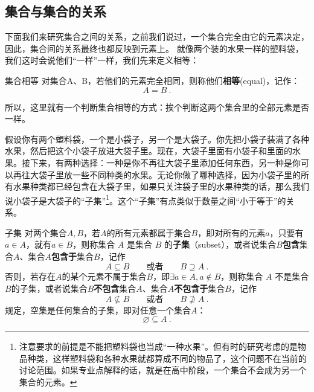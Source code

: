 \subsection{集合与集合的关系}\label{sub_HsSet_1}
下面我们来研究集合之间的关系，之前我们说过，一个集合完全由它的元素决定，因此，集合间的关系最终也都反映到元素上。
就像两个装的水果一样的塑料袋，我们这时会说他们“一样”一样，我们先来定义相等：
\begin{definition}{集合相等}
对集合A、B，若他们的元素完全相同，则称他们\textbf{相等}(equal)，记作：
\begin{equation}
A=B~.
\end{equation}
\end{definition}

所以，这里就有一个判断集合相等的方式：挨个判断这两个集合里的全部元素是否一样。

假设你有两个塑料袋，一个是小袋子，另一个是大袋子。你先把小袋子装满了各种水果，然后把这个小袋子放进大袋子里。现在，大袋子里面有小袋子和里面的水果。接下来，有两种选择：一种是你不再往大袋子里添加任何东西，另一种是你可以再往大袋子里放一些不同种类的水果。无论你做了哪种选择，因为小袋子里的所有水果种类都已经包含在大袋子里，如果只关注袋子里的水果种类的话，那么我们说小袋子是大袋子的“子集”\footnote{注意要求的前提是不能把塑料袋也当成“一种水果”。但有时的研究考虑的是物品种类，这样塑料袋和各种水果就都算成不同的物品了，这个问题不在当前的讨论范围。如果专业点解释的话，就是在高中阶段，一个集合不会成为另一个集合的元素。}。这个“子集”有点类似于数量之间“小于等于”的关系。

\begin{definition}{子集}\label{def_HsSet_3}
对两个集合$A,B$，若$A$的所有元素都属于集合$B$，即对所有的元素$a$，只要有$a\in A$，就有$a\in B$，则称集合 $A$ 是集合 $B$ 的\textbf{子集}（subset），或者说集合$B$\textbf{包含}集合$A$、集合$A$\textbf{包含于}集合$B$，记作
\begin{equation}
A \subseteq B\qquad\text{或者}\qquad B \supseteq A~.
\end{equation}
否则，若存在$A$的某个元素不属于集合$B$，即$\exists a\in A,a\notin B$，则称集合 $A$ 不是集合$B$的子集，或者说集合$B$\textbf{不包含}集合$A$、集合$A$\textbf{不包含于}集合$B$，记作
\begin{equation}
A \nsubseteq B\qquad\text{或者}\qquad B \nsupseteq A~.
\end{equation}
规定，空集是任何集合的子集，即对任意一个集合$A$：
\begin{equation}
\varnothing \subseteq A~.
\end{equation}
\end{definition}


